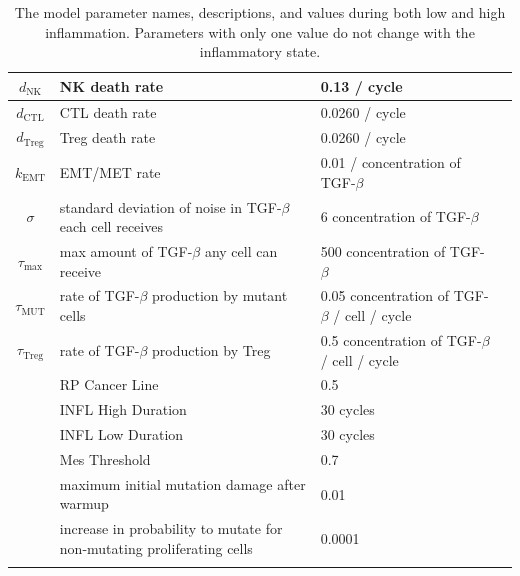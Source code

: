 \documentclass[11pt, a4paper, preprint]{article}
\begin{document}
\begin{longtable}{| c | p{5cm} | m{3cm} | m{3cm} |}
  \hline
  $d_\text{NK}$ & NK death rate & 0.13 / cycle &  \\ 
  \hline
  $d_\text{CTL}$ & CTL death rate & 0.0260 / cycle& \\ 
  \hline
  $d_\text{Treg}$ & Treg death rate & 0.0260 / cycle& \\ 
  \hline
  $k_\text{EMT}$ & EMT/MET rate & 0.01 / concentration of TGF-$\beta$ & \\
  \hline
  $\sigma$ & standard deviation of noise in TGF-$\beta$ each cell receives & 6 concentration of TGF-$\beta$ & \\
  \hline
 $\tau_\text{max}$ & max amount of TGF-$\beta$ any cell can receive & 500 concentration of TGF-$\beta$ &\\
  \hline 
 $\tau_\text{MUT}$ & rate of TGF-$\beta$ production by mutant cells & 0.05 concentration of TGF-$\beta$ / cell / cycle& \\
  \hline
 $\tau_\text{Treg}$ & rate of TGF-$\beta$ production by Treg & 0.5 concentration of TGF-$\beta$ / cell / cycle& \\
  \hline
  & RP Cancer Line  & 0.5 &  \\ 
 \hline
&  INFL High Duration & 30 cycles&   \\
 \hline
 & INFL Low Duration &30 cycles&   \\
 \hline
& Mes Threshold & 0.7 &    \\
 \hline
  & maximum initial mutation damage after warmup  & 0.01 &\\
  \hline
  & increase in probability to mutate for non-mutating proliferating cells & 0.0001 & \\
  \hline
  \caption{The model parameter names, descriptions, and values during both low and high inflammation. Parameters with only one value do not change with the inflammatory state.}
\end{longtable}
\end{document}
